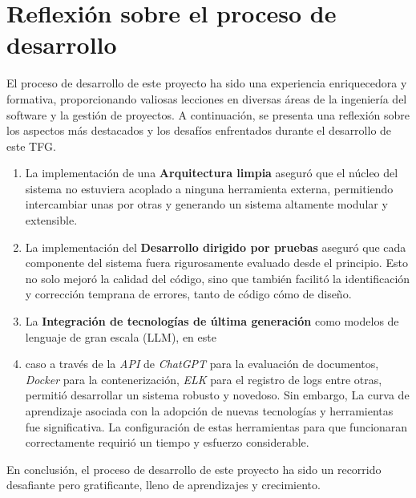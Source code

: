 \section{Reflexión sobre el proceso de desarrollo}

El proceso de desarrollo de este proyecto ha sido una experiencia enriquecedora y formativa, proporcionando valiosas
lecciones en diversas áreas de la ingeniería del software y la gestión de proyectos.
A continuación, se presenta una reflexión sobre los aspectos más destacados y los desafíos enfrentados durante el
desarrollo de este TFG.

\begin{enumerate}
    \ite
    La planificación y ejecución de un proceso de desarrollo utilizando \textbf{Metodologías ágiles} requirieron una
    constante evaluación y ajuste, lo que implicó un esfuerzo adicional.
    Sin embargo, este enfoque resultó en una mayor flexibilidad y capacidad de respuesta a las necesidades emergentes
    del proyecto.
    \item
    La implementación de una \textbf{Arquitectura limpia}
    aseguró que el núcleo del sistema no estuviera acoplado a ninguna herramienta externa, permitiendo intercambiar unas
    por otras y generando un sistema altamente modular y extensible.
    \item
    La implementación del \textbf{Desarrollo dirigido por pruebas} aseguró que cada componente del sistema fuera
    rigurosamente evaluado desde el principio.
    Esto no solo mejoró la calidad del código, sino que también facilitó la identificación y corrección temprana de
    errores, tanto de código cómo de diseño.
    \item
    La \textbf{Integración de tecnologías de última generación} como modelos de lenguaje de gran escala (LLM), en este
    \item caso a través de la \textit{API} de \textit{ChatGPT} para la evaluación de documentos, \textit{Docker}
    para la contenerización, \textit{ELK} para el registro de logs entre otras, permitió desarrollar un sistema
    robusto y novedoso.
    Sin embargo, La curva de aprendizaje asociada con la adopción de nuevas tecnologías y herramientas fue
    significativa.
    La configuración de estas herramientas para que funcionaran correctamente requirió un tiempo y esfuerzo
    considerable.
\end{enumerate}

En conclusión, el proceso de desarrollo de este proyecto ha sido un recorrido desafiante pero gratificante, lleno de
aprendizajes y crecimiento.
